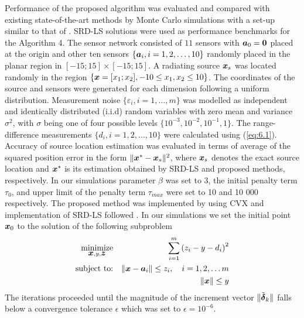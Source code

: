 Performance of the proposed algorithm was evaluated and compared with existing state-of-the-art methods by Monte Carlo simulations with a set-up similar to that of \cite{BeckStLi}. SRD-LS solutions were used as performance benchmarks for the Algorithm 4. The sensor network consisted of $11$ sensors with $\mbox{\boldmath$a$}_0 = \mbox{\boldmath{$0$}}$ placed at the origin and other ten sensors  $\{\mbox{\boldmath$a$}_i, i = 1, 2,\ldots,10\}$ randomly placed in the planar region in $[-15;15]\times[-15;15]$. A radiating source $\mbox{\boldmath$x$}_s$ was located randomly in the region $\{\mbox{\boldmath$x$}=[x_1;x_2], -10\leq x_1,x_2\leq 10\}$. The coordinates of the source and sensors were generated for each dimension following a uniform distribution. Measurement noise $\{\varepsilon_i, i=1,\ldots,m\}$ was modelled as independent and identically distributed (i.i.d) random variables with zero mean and variance $\sigma^2$, with $\sigma$ being one of four possible levels $\{10^{-3}, 10^{-2}, 10^{-1}, 1\}$.  The range-difference measurements $\{d_i, i=1, 2,\ldots,10\}$ were calculated using (\ref{eq:6.1}). Accuracy of source location estimation was evaluated in terms of average of the squared position error in the form $\|\mbox{\boldmath$x$}^*-\mbox{\boldmath$x$}_s\|^2$, where $\mbox{\boldmath$x$}_s$ denotes the exact source location and $\mbox{\boldmath$x$}^*$ is its estimation obtained by SRD-LS and proposed methods, respectively.  
In our simulations parameter $\beta$ was set to 3, the initial penalty term $\tau_0$, and upper limit of the penalty term $\tau_{max}$ were set to 10 and 10 000 respectively. The proposed method was implemented by using  CVX  \cite{cvx} and implementation of SRD-LS followed \cite{BeckStLi}. In our simulations we set the initial point $\mbox{\boldmath$x$}_0$ to the solution of the following subproblem
\setcounter{abc}{0}
\begin{eqnarray} \label{eq:initpnt}
\nonumber
\mathop{\mbox{minimize}}_{\mbox{\boldmath$x$}, y, \mbox{\boldmath$z$}} & &\sum^m_{i=1}\left( z_i - y - d_i\right)^2\\
\nonumber
\mbox{subject to:}& &\|\mbox{\boldmath$x$} - \mbox{\boldmath$a$}_i\| \leq z_i, \quad  i = 1, 2, \ldots m \\
\nonumber
& &\|\mbox{\boldmath$x$}\|  \leq y
\end{eqnarray}
\noindent
The iterations proceeded until the magnitude of the increment vector $\|\tilde{\mbox{\boldmath${\delta}$}}_k\|$ falls below a convergence tolerance $\epsilon$ which was set to $\epsilon = 10^{-6}$. 

